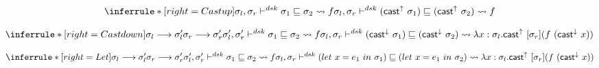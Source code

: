 \[
\inferrule*[right=Castup]
{
\sigmal, \sigmar \polymorphic  \sigma_1 \sqsubseteq \sigma_2 \transto {f}}
{\sigmal, \sigmar \polymorphicstar  (\castupe \sigma_1) \sqsubseteq  (\castupe \sigma_2) \transto {f}}
\]


\[
\inferrule*[right=Castdown]
{\sigmal \longrightarrow \sigmal' \\
\sigmar \longrightarrow \sigmar' \\
\sigmal', \sigmar' \polymorphic  \sigma_1 \sqsubseteq \sigma_2 \transto {f}
}
{\sigmal, \sigmar \polymorphicstar  (\castdowne \sigma_1) \sqsubseteq  (\castdowne \sigma_2)
\transto{ \lambda x:\sigmal. \castupe [\sigmar] (f\ (\castdowne x))}}
\]

\[
\inferrule*[right=Let]
{\sigmal \longrightarrow \sigmal'\\
\sigmar \longrightarrow \sigmar' \\
\sigmal', \sigmar' \polymorphic  \sigma_1 \sqsubseteq \sigma_2 \transto {f}
}
{\sigmal, \sigmar \polymorphicstar  (let\ x = e_1\ in\ \sigma_1) \sqsubseteq  (let\ x = e_1\ in\ \sigma_2) \\
\transto{ \lambda x:\sigmal. \castupe [\sigmar] (f\ (\castdowne x))}}
\]

\clearpage


